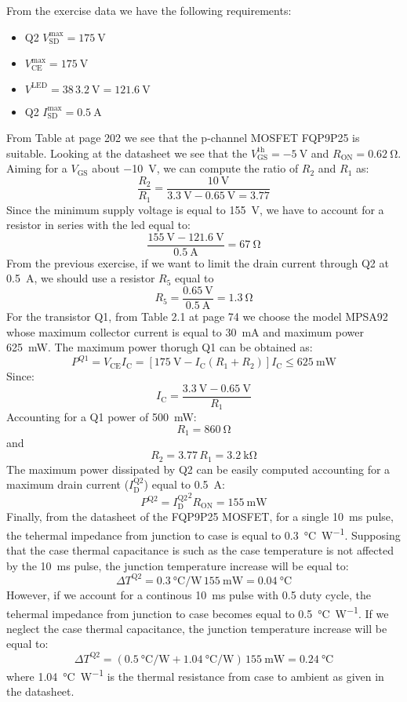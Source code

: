 From the exercise data we have the following requirements:
\begin{itemize}
    \item Q2 $V_\text{SD}^\text{max}=\SI{175}{\volt}$
    \item $V_\text{CE}^\text{max}=\SI{175}{\volt}$
    \item $V^\text{LED}=38\,\SI{3.2}{\volt}=\SI{121.6}{\volt}$
    \item Q2 $I_\text{SD}^\text{max}=\SI{0.5}{\ampere}$
\end{itemize}
From Table at page 202 we see that the p-channel MOSFET FQP9P25 is suitable. Looking at the datasheet we see that the $V_\text{GS}^\text{th}=-\SI{5}{\volt}$ and $R_\text{ON}=\SI{0.62}{\ohm}$. Aiming for a $V_\text{GS}$ about \SI{-10}{\volt}, we can compute the ratio of $R_2$ and $R_1$ as:
\[\frac{R_2}{R_1}=\frac{\SI{10}{\volt}}{\SI{3.3}{\volt}-\SI{0.65}{\volt}=3.77}\]
Since the minimum supply voltage is equal to \SI{155}{\volt}, we have to account for a resistor in series with the led equal to:
\[\frac{\SI{155}{\volt}-\SI{121.6}{\volt}}{\SI{0.5}{\ampere}}=\SI{67}{\ohm}\]
From the previous exercise, if we want to limit the drain current through Q2 at \SI{0.5}{\ampere}, we should use a resistor $R_5$ equal to
\[R_5=\frac{\SI{0.65}{\volt}}{\SI{0.5}{\ampere}}=\SI{1.3}{\ohm}\]
For the transistor Q1, from Table 2.1 at page 74 we choose the model MPSA92 whose maximum collector current is equal to \SI{30}{\milli\ampere} and maximum power \SI{625}{\milli\watt}. The maximum power thorugh Q1 can be obtained as:
\[P^{Q1}=V_\text{CE}I_\text{C}=[\SI{175}{\volt}-I_\text{C}(R_1+R_2)]I_\text{C}\leq\SI{625}{\milli\watt}\]
Since:
\[I_\text{C}=\frac{\SI{3.3}{\volt}-\SI{0.65}{\volt}}{R_1}\]
Accounting for a Q1 power of \SI{500}{\milli\watt}:
\[R_1=\SI{860}{\ohm}\]
and
\[R_2=3.77\,R_1=\SI{3.2}{\kilo\ohm}\]
The maximum power dissipated by Q2 can be easily computed accounting for a maximum drain current ($I_\text{D}^\text{Q2}$) equal to \SI{0.5}{\ampere}:
\[P^\text{Q2}={I_\text{D}^\text{Q2}}^2R_\text{ON}=\SI{155}{\milli\watt}\]
Finally, from the datasheet of the FQP9P25 MOSFET, for a single \SI{10}{\milli\second} pulse, the tehermal impedance from junction to case is equal to \SI{0.3}{\celsius\per\watt}. Supposing that the case thermal capacitance is such as the case temperature is not affected by the \SI{10}{\milli\second} pulse, the junction temperature increase will be equal to:
\[\Delta T^\text{Q2}= \SI{0.3}{\celsius\per\watt}\,\SI{155}{\milli\watt}=\SI{0.04}{\celsius}\]
However, if we account for a continous \SI{10}{\milli\second} pulse with \num{0.5} duty cycle, the tehermal impedance from junction to case becomes equal to \SI{0.5}{\celsius\per\watt}. If we neglect the case thermal capacitance, the  junction temperature increase will be equal to:
\[\Delta T^\text{Q2}= (\SI{0.5}{\celsius\per\watt}+\SI{1.04}{\celsius\per\watt})\,\SI{155}{\milli\watt}=\SI{0.24}{\celsius}\]
where \SI{1.04}{\celsius\per\watt} is the thermal resistance from case to ambient as given in the datasheet.
